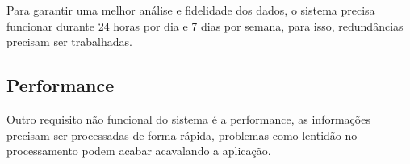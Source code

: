 Para garantir uma melhor análise e fidelidade dos dados, o sistema precisa funcionar durante 24 horas por dia e 7 dias por semana, para isso, redundâncias precisam ser trabalhadas.

\subsection{Performance}

Outro requisito não funcional do sistema é a performance, as informações precisam ser processadas de forma rápida, problemas como lentidão no processamento podem acabar acavalando a aplicação.
